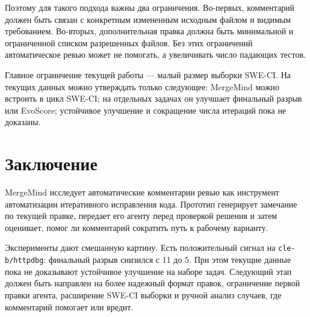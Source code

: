 \documentclass[12pt,a4paper]{article}
\begin{document}
Поэтому для такого подхода важны два ограничения. Во-первых, комментарий должен
быть связан с конкретным измененным исходным файлом и видимым требованием.
Во-вторых, дополнительная правка должна быть минимальной и ограниченной списком
разрешенных файлов. Без этих ограничений автоматическое ревью может не помогать, а
увеличивать число падающих тестов.

Главное ограничение текущей работы --- малый размер выборки SWE-CI. На текущих
данных можно утверждать только следующее: MergeMind можно встроить в цикл
SWE-CI; на отдельных задачах он улучшает финальный разрыв или EvoScore; устойчивое
улучшение и сокращение числа итераций пока не доказаны.

\section{Заключение}

MergeMind исследует автоматические комментарии ревью как инструмент
автоматизации итеративного исправления кода. Прототип генерирует замечание по
текущей правке, передает его агенту перед проверкой решения и затем оценивает,
помог ли комментарий сократить путь к рабочему варианту.

Эксперименты дают смешанную картину. Есть положительный сигнал на
\texttt{cle-b/httpdbg}: финальный разрыв снизился с 11 до 5. При этом текущие
данные пока не доказывают устойчивое улучшение на наборе задач. Следующий этап
должен быть направлен на более надежный формат правок, ограничение первой
правки агента, расширение SWE-CI выборки и ручной анализ случаев, где
комментарий помогает или вредит.
\end{document}
